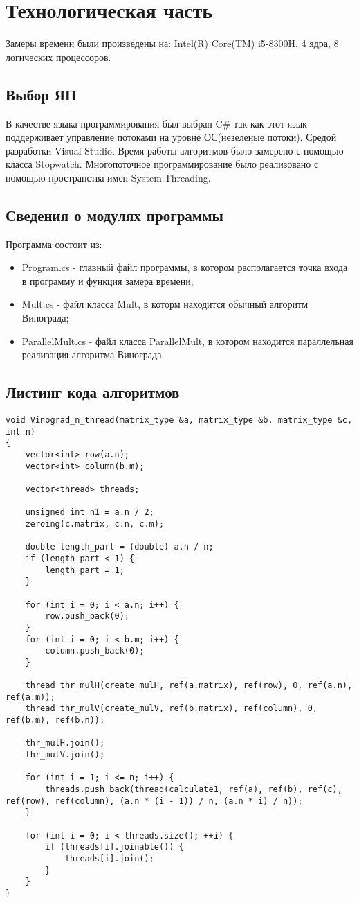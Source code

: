 \documentclass[12pt]{report}
\begin{document}
 

\chapter{Технологическая часть}
Замеры времени были произведены на: Intel(R) Core(TM) i5-8300H, 4 ядра, 8 логических процессоров.

\section{Выбор ЯП}
В качестве языка программирования был выбран C\# \cite{Microsoft} так как этот
язык поддерживает управление потоками на уровне ОС(незеленые потоки). Средой разработки Visual Studio. 
Время работы алгоритмов было замерено с помощью класса Stopwatch. Многопоточное программирование было
реализовано с помощью пространства имен System.Threading.

\section{Сведения о модулях программы}
Программа состоит из:
\begin{itemize}
	\item Program.cs - главный файл программы, в котором располагается точка входа в программу и функция замера времени;
	\item Mult.cs - файл класса Mult, в которм находится обычный алгоритм Винограда;
	\item ParallelMult.cs - файл класса ParallelMult, в котором находится параллельная реализация алгоритма Винограда.
\end{itemize}


\section{Листинг кода алгоритмов}


\begin{lstlisting}[label=some-code,caption=Алгоритм Винограда]
void Vinograd_n_thread(matrix_type &a, matrix_type &b, matrix_type &c, int n)
{
	vector<int> row(a.n);
	vector<int> column(b.m);
	
	vector<thread> threads;
	
	unsigned int n1 = a.n / 2;
	zeroing(c.matrix, c.n, c.m);
	
	double length_part = (double) a.n / n;
	if (length_part < 1) {
		length_part = 1;
	}
	
	for (int i = 0; i < a.n; i++) {
		row.push_back(0);
	}
	for (int i = 0; i < b.m; i++) {
		column.push_back(0);
	}
	
	thread thr_mulH(create_mulH, ref(a.matrix), ref(row), 0, ref(a.n), ref(a.m));
	thread thr_mulV(create_mulV, ref(b.matrix), ref(column), 0, ref(b.m), ref(b.n));
	
	thr_mulH.join();
	thr_mulV.join();
	
	for (int i = 1; i <= n; i++) {
		threads.push_back(thread(calculate1, ref(a), ref(b), ref(c), ref(row), ref(column), (a.n * (i - 1)) / n, (a.n * i) / n));
	}
	
	for (int i = 0; i < threads.size(); ++i) {
		if (threads[i].joinable()) {
			threads[i].join();
		}
	}
}
\end{lstlisting}
\end{document}
